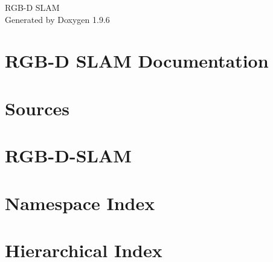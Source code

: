 \documentclass[twoside]{book}
\newcommand{\+}{\discretionary{\mbox{\scriptsize$\hookleftarrow$}}{}{}}
\newcommand{\clearemptydoublepage}{%
    \newpage{\pagestyle{empty}\cleardoublepage}%
  }
\begin{document}
  \raggedbottom
    \hypersetup{pageanchor=false,
                bookmarksnumbered=true,
                pdfencoding=unicode
               }
  \begin{titlepage}
  \vspace*{7cm}
  \begin{center}%
  {\Large RGB-\/\+D SLAM}\\
  \vspace*{1cm}
  {\large Generated by Doxygen 1.9.6}\\
  \end{center}
  \end{titlepage}
  \clearemptydoublepage
  \tableofcontents
  \clearemptydoublepage
  \hypersetup{pageanchor=true}
\chapter{RGB-\/D SLAM Documentation}
\label{index}\hypertarget{index}{}
\chapter{Sources}
\label{md__home_baptisteh__documents_code_robots__r_g_b__s_l_a_m__r_g_b__d__s_l_a_m_src__r_e_a_d_m_e}

\chapter{RGB-\/\+D-\/\+SLAM}
\label{md__home_baptisteh__documents_code_robots__r_g_b__s_l_a_m__r_g_b__d__s_l_a_m__r_e_a_d_m_e}

\chapter{Namespace Index}

\chapter{Hierarchical Index}

\end{document}
